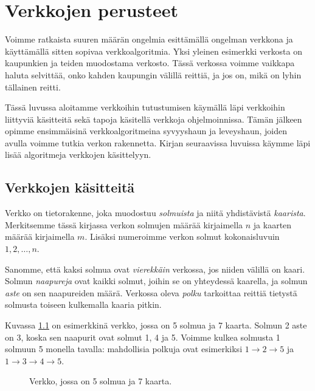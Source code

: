 \chapter{Verkkojen perusteet}

Voimme ratkaista suuren määrän ongelmia esittämällä ongelman
verkkona ja käyttämällä sitten sopivaa verkkoalgoritmia.
Yksi yleinen esimerkki verkosta on kaupunkien ja teiden muodostama verkosto.
Tässä verkossa voimme vaikkapa haluta selvittää, onko kahden kaupungin
välillä reittiä, ja jos on, mikä on lyhin tällainen reitti.

Tässä luvussa aloitamme verkkoihin tutustumisen käymällä läpi
verkkoihin liittyviä käsitteitä sekä tapoja käsitellä verkkoja ohjelmoinnissa.
Tämän jälkeen opimme ensimmäisinä verkkoalgoritmeina syvyyshaun ja leveyshaun,
joiden avulla voimme tutkia verkon rakennetta.
Kirjan seuraavissa luvuissa käymme läpi lisää algoritmeja
verkkojen käsittelyyn.

\section{Verkkojen käsitteitä}

Verkko on tietorakenne, joka muodostuu \emph{solmuista} ja
niitä yhdistävistä \emph{kaarista}.
Merkitsemme tässä kirjassa verkon solmujen
määrää kirjaimella $n$ ja kaarten määrää
kirjaimella $m$.
Lisäksi numeroimme verkon solmut kokonaisluvuin
$1,2,\dots,n$.

Sanomme, että kaksi solmua ovat \emph{vierekkäin} verkossa,
jos niiden välillä on kaari.
Solmun \emph{naapureja} ovat kaikki solmut,
joihin se on yhteydessä kaarella,
ja solmun \emph{aste} on sen naapureiden määrä.
Verkossa oleva \emph{polku} tarkoittaa reittiä
tietystä solmusta toiseen kulkemalla kaaria pitkin.

Kuvassa \ref{fig:veresi} on esimerkkinä verkko,
jossa on 5 solmua ja 7 kaarta.
Solmun 2 aste on 3,
koska sen naapurit ovat solmut 1, 4 ja 5.
Voimme kulkea solmusta 1 solmuun 5 monella tavalla:
mahdollisia polkuja ovat esimerkiksi
$1 \rightarrow 2 \rightarrow 5$ ja
$1 \rightarrow 3 \rightarrow 4 \rightarrow 5$.

\begin{figure}
\center
\begin{center}
\end{center}
\caption{Verkko, jossa on 5 solmua ja 7 kaarta.}
\label{fig:veresi}
\end{figure}

